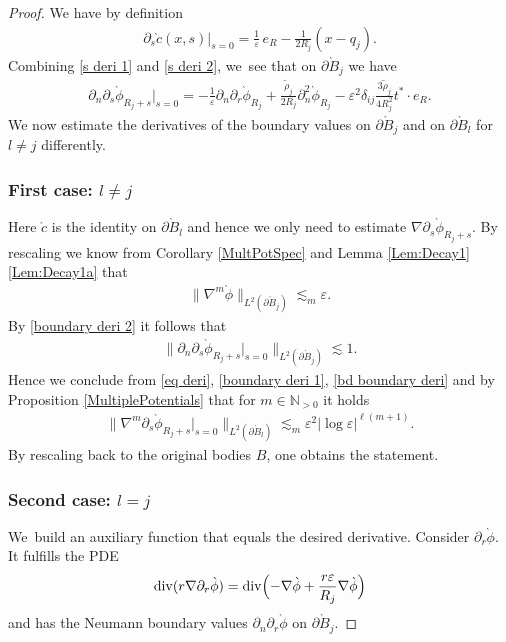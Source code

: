\documentclass[10pt]{amsart}
\let\epsilon\varepsilon
\theoremstyle{definition}
\renewcommand{\div}{\operatorname{div}}
\newcommand\N{\mathbb{N}}
\newcommand\bnorm[1]{\bigl\lVert #1\bigr\rVert}
\newcommand\eq{=}
\let\de\partial
\let\eps\epsilon
\begin{document}
\begin{proof}
We have by definition
\begin{align*}
\de_s\grave{c}(x,s)\big|_{s=0}\eq\frac{1}{\eps}\,e_R-\frac{1}{2R_j}(x-q_j).
\end{align*}
Combining \eqref{s deri 1} and \eqref{s deri 2}, we~see that on $\de\grave{B}_j$ we have
\begin{align}
\de_n\de_{s}\grave{\phi}_{R_j+s}\big|_{s=0}\eq - \frac{1}{\eps}\de_n\de_r\grave{\phi}_{R_j}+\frac{\tilde{\rho}_j}{2R_j}\de_n^2\grave{\phi}_{R_j}-\eps^2\delta_{ij}\frac{3\tilde{\rho}_j}{4R_j^2}t^*\cdot e_R.\label{boundary deri 2}
\end{align}
We now estimate the derivatives of the boundary values on $\de\grave{B}_j$ and on $\de\grave{B}_l$ for $l\neq j$ differently.

\subsubsection*{First case: $l\neq j$}
Here $\grave{c}$ is the identity on $\de\grave{B}_l$ and hence we only need to estimate $\nabla\de_s\grave{\phi}_{R_j+s}$.
By rescaling we know from Corollary \ref{MultPotSpec} and Lemma \ref{Lem:Decay1}\,\eqref{Lem:Decay1a} that
\begin{align*}
\bnorm{\nabla^m\grave{\phi}}_{L^2(\de\grave{B}_j)}\lesssim_m \eps.
\end{align*}
By \eqref{boundary deri 2} it follows that
\begin{align}
\bnorm{\de_n\de_{s}\grave{\phi}_{R_j+s}\big|_{s=0}}_{L^2(\de\grave{B}_j)}\lesssim 1.\label{bd boundary deri}
\end{align}
Hence we conclude from \eqref{eq deri}, \eqref{boundary deri 1}, \eqref{bd boundary deri} and by Proposition \ref{MultiplePotentials} that for $m\in \N_{>0}$ it holds
\begin{align*}
\bnorm{\nabla^m\de_s\grave{\phi}_{R_j+s}\big|_{s=0}}_{L^2(\de\grave{B}_l)}\lesssim_m \eps^{2}|{\log\eps}|^{\ell(m+1)}.
\end{align*}
By rescaling back to the original bodies $B$, one obtains the statement.

\subsubsection*{Second case: $l=j$}
We~build an auxiliary function that equals the desired derivative.
Consider $\de_r\grave{\phi}$. It fulfills the PDE
\begin{align}
\div(r\nabla\de_r\grave{\phi})\eq\div\Bigl(-\nabla\grave{\phi}+\frac{r\eps}{R_j}\nabla\grave{\phi}\Bigr) \label{r eq}
\end{align}
and has the Neumann boundary values $\de_n\de_r\grave{\phi}$ on $\de\grave{B}_j$.


\end{proof}
\end{document}
